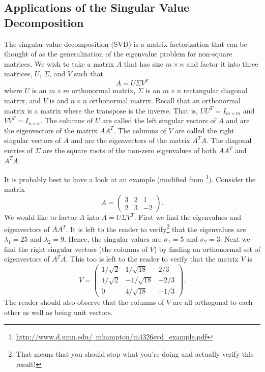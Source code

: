 \subsection{Applications of the Singular Value Decomposition}
The singular value decomposition (SVD) is a matrix factorization that can be thought of as
the generalization of the eigenvalue problem for non-square matrices.  We wish to take a
matrix $A$ that has size $m \times n$ and factor it into three matrices, $U$, $\Sigma$,
and $V$ such that 
\[ A = U \Sigma V^T \]
where $U$ is an $m \times m$ orthonormal matrix, $\Sigma$ is an $m \times n$ rectangular
diagonal matrix, and $V$ is and $n \times n$ orthonormal matrix.  Recall that an
orthonormal matrix
is a matrix where the transpose is the inverse.  That is, $UU^T = I_{m \times m}$ and $VV^T
= I_{n \times n}$. The columns of $U$ are called the left singular vectors of $A$ and are
the eigenvectors of the matrix $AA^T$.  The columns of $V$ are called the right singular
vectors of $A$ and are the eigenvectors of the matrix $A^TA$.  The diagonal entries of
$\Sigma$ are the square roots of the non-zero eigenvalues of both $AA^T$ and $A^TA$.

It is probably best to have a look at an example (modified from
\footnote{\href{http://www.d.umn.edu/~mhampton/m4326svd_example.pdf}{http://www.d.umn.edu/~mhampton/m4326svd\_example.pdf}}).  Consider the matrix 
\[ A = \begin{pmatrix} 3 & 2 & 1 \\ 2 & 3 & -2 \end{pmatrix}. \]
We would like to factor $A$ into $A = U \Sigma V^T$.  First we find the eigenvalues and
eigenvectors of $AA^T$.  It is left to the reader to verify\footnote{That means that you
should stop what you're doing and actually verify this result!} that the eigenvalues are
$\lambda_1 = 25$ and $\lambda_2 = 9$.  Hence, the singular values are $\sigma_1 = 5$ and
$\sigma_2 = 3$.  Next we find the right singular vectors (the columns of $V$) by finding
an orthonormal set of eigenvectors of $A^TA$.  This too is left to the reader to verify
that the matrix $V$ is 
\[ V = \begin{pmatrix}
        1/\sqrt{2} & 1/\sqrt{18} & 2/3 \\
        1/\sqrt{2} & -1/\sqrt{18} & -2/3 \\
        0 & 4/\sqrt{18} & -1/3 
    \end{pmatrix}. \]
The reader should also observe that the columns of $V$ are all orthogonal to each other as
well as being unit vectors.

